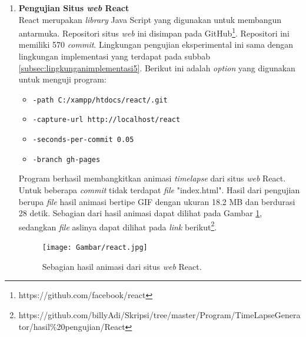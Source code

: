 \begin{enumerate}
\item \textbf{Pengujian Situs \textit{web} React}\\
React merupakan \textit{library} Java Script yang digunakan untuk membangun antarmuka. Repositori situs \textit{web} ini disimpan pada GitHub\footnote{https://github.com/facebook/react}. Repositori ini memiliki 570 \textit{commit}. Lingkungan pengujian eksperimental ini sama dengan lingkungan implementasi yang terdapat pada subbab \ref{subsec:lingkunganimplementasi5}. Berikut ini adalah \textit{option} yang digunakan untuk menguji program:
\begin{itemize}
\item \texttt{-path C:/xampp/htdocs/react/.git}
\item \texttt{-capture-url http://localhost/react}
\item \texttt{-seconds-per-commit 0.05}
\item \texttt{-branch gh-pages} 
\end{itemize}
Program berhasil membangkitkan animasi \textit{timelapse} dari situs \textit{web} React. Untuk beberapa \textit{commit} tidak terdapat \textit{file} "index.html". Hasil dari pengujian berupa \textit{file} hasil animasi bertipe GIF dengan ukuran 18.2 MB dan berdurasi 28 detik. Sebagian dari hasil animasi dapat dilihat pada Gambar \ref{fig:hasil_react}, sedangkan \textit{file} aslinya dapat dilihat pada \textit{link} berikut\footnote{https://github.com/billyAdi/Skripsi/tree/master/Program/TimeLapseGenerator/hasil\%20pengujian/React}.


\begin{figure}[H]	
		\texttt{[image: Gambar/react.jpg]}
	\caption{Sebagian hasil animasi dari situs \textit{web} React.}
	\label{fig:hasil_react}
\end{figure}





\end{enumerate}
